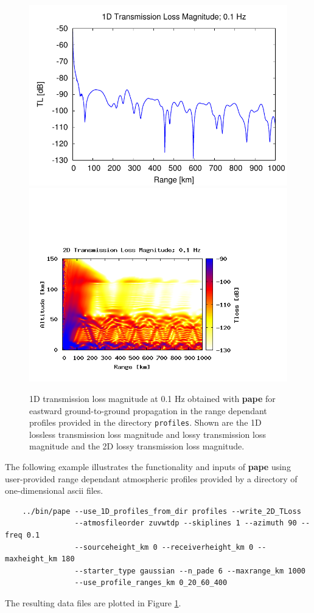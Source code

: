 \begin{figure}[h]
\begin{center}
\includegraphics[scale=0.60]{figs/pade_ex2_1d}
\includegraphics[scale=0.45,trim = 20 20 110 140,clip]{figs/pade_ex2_2d.png}
\end{center}
\caption{1D transmission loss magnitude at 0.1 Hz obtained with {\bf pape} for eastward ground-to-ground propagation in the range dependant profiles provided in the directory {\tt profiles}. Shown are the 1D lossless transmission loss magnitude and lossy transmission loss magnitude and the 2D lossy transmission loss magnitude.}
\label{fig: pade ex2}
\end{figure}

The following example illustrates the functionality and inputs of {\bf pape} using user-provided range dependant atmospheric profiles provided by a directory of one-dimensional ascii files. 
\begin{verbatim}
    ../bin/pape --use_1D_profiles_from_dir profiles --write_2D_TLoss
                --atmosfileorder zuvwtdp --skiplines 1 --azimuth 90 --freq 0.1 
                --sourceheight_km 0 --receiverheight_km 0 --maxheight_km 180 
                --starter_type gaussian --n_pade 6 --maxrange_km 1000  
                --use_profile_ranges_km 0_20_60_400
\end{verbatim}
The resulting data files are plotted in Figure \ref{fig: pade ex2}. 


